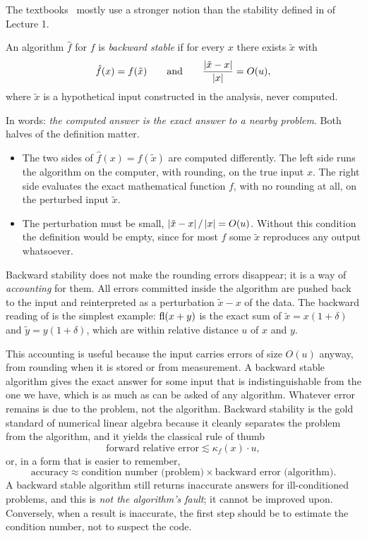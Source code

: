 The textbooks~\cite[Lecture 14]{TB} mostly use a stronger notion than the stability defined in  of Lecture 1.

\begin{definition}
  \label{def:backward-stable}
  An algorithm $\hat{f}$ for $f$ is \emph{backward stable} if for every $x$ there exists $\tilde{x}$ with
  \begin{equation}
    \hat{f}(x) = f(\tilde{x}) \qquad \text{and} \qquad \frac{\left\lvert \tilde{x} - x \right\rvert}{\left\lvert x \right\rvert} = O(u),
  \end{equation}
  where $\tilde{x}$ is a hypothetical input constructed in the analysis, never computed.
\end{definition}

In words: \emph{the computed answer is the exact answer to a nearby problem}. Both halves of the definition matter.
\begin{itemize}
  \item The two sides of $\hat{f}(x) = f(\tilde{x})$ are computed differently. The left side runs the algorithm on the computer, with rounding, on the true input $x$. The right side evaluates the exact mathematical function $f$, with no rounding at all, on the perturbed input $\tilde{x}$.
  \item The perturbation must be small, $\left\lvert \tilde{x} - x \right\rvert/\left\lvert x \right\rvert = O(u)$. Without this condition the definition would be empty, since for most $f$ some $\tilde{x}$ reproduces any output whatsoever.
\end{itemize}
Backward stability does not make the rounding errors disappear; it is a way of \emph{accounting} for them. All errors committed inside the algorithm are pushed back to the input and reinterpreted as a perturbation $\tilde{x} - x$ of the data. The backward reading of  is the simplest example: $\operatorname{fl}(x + y)$ is the exact sum of $\tilde{x} = x(1 + \delta)$ and $\tilde{y} = y(1 + \delta)$, which are within relative distance $u$ of $x$ and $y$.

This accounting is useful because the input carries errors of size $O(u)$ anyway, from rounding when it is stored or from measurement. A backward stable algorithm gives the exact answer for some input that is indistinguishable from the one we have, which is as much as can be asked of any algorithm. Whatever error remains is due to the problem, not the algorithm. Backward stability is the gold standard of numerical linear algebra because it cleanly separates the problem from the algorithm, and it yields the classical rule of thumb
\begin{equation}
  \text{forward relative error} \lesssim \kappa_f(x) \cdot u,
\end{equation}
or, in a form that is easier to remember,
\begin{equation}
  \text{accuracy} \approx \text{condition number (problem)} \times \text{backward error (algorithm)}.
\end{equation}
A backward stable algorithm still returns inaccurate answers for ill-conditioned problems, and this is \emph{not the algorithm's fault}; it cannot be improved upon. Conversely, when a result is inaccurate, the first step should be to estimate the condition number, not to suspect the code.

